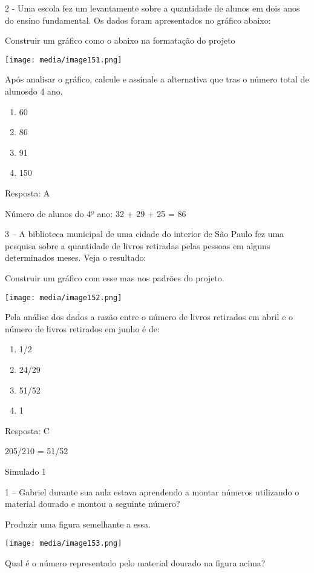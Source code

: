 2 - Uma escola fez um levantamente sobre a quantidade de alunos em dois
anos do ensino fundamental. Os dados foram apresentados no gráfico
abaixo:

Construir um gráfico como o abaixo na formatação do projeto

\texttt{[image: media/image151.png]}

Após analisar o gráfico, calcule e assinale a alternativa que tras o
número total de alunosdo 4 ano.

\begin{enumerate}
\def\labelenumi{\alph{enumi})}
\item
  60
\item
  86
\item
  91
\item
  150
\end{enumerate}

Resposta: A

Número de alunos do 4º ano: 32 + 29 + 25 = 86

3 -- A biblioteca municipal de uma cidade do interior de São Paulo fez
uma pesquisa sobre a quantidade de livros retiradas pelas pessoas em
alguns determinados meses. Veja o resultado:

Construir um gráfico com esse mas nos padrões do projeto.

\texttt{[image: media/image152.png]}

Pela análise dos dados a razão entre o número de livros retirados em
abril e o número de livros retirados em junho é de:

\begin{enumerate}
\def\labelenumi{\alph{enumi})}
\item
  1/2
\item
  24/29
\item
  51/52
\item
  1
\end{enumerate}

Resposta: C

205/210 = 51/52

Simulado 1

1 -- Gabriel durante sua aula estava aprendendo a montar números
utilizando o material dourado e montou a seguinte número?

Produzir uma figura semelhante a essa.

\texttt{[image: media/image153.png]}

Qual é o número representado pelo material dourado na figura acima?

